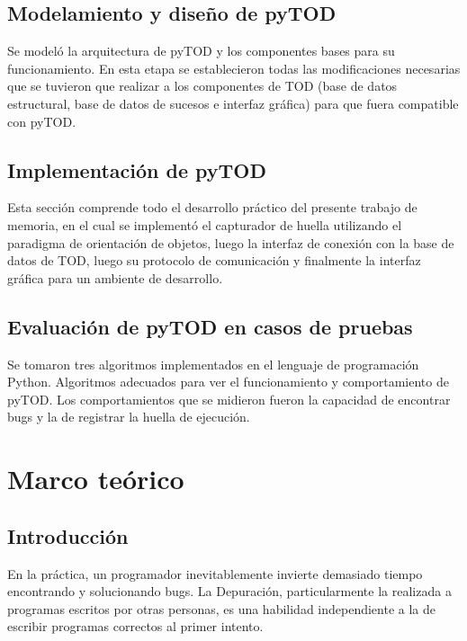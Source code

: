\documentclass[12pt,legalpaper]{report}
\begin{document}
	\section{Modelamiento y diseño de pyTOD}

    Se modeló la arquitectura de pyTOD y los componentes bases para su funcionamiento.  En esta etapa se establecieron todas las modificaciones necesarias que se tuvieron que realizar a los componentes de TOD (base de datos estructural, base de datos de sucesos e interfaz gráfica) para que fuera compatible con pyTOD.

	\section{Implementación de pyTOD}

    Esta sección comprende todo el desarrollo práctico del presente trabajo de memoria, en el cual se implementó el capturador de huella utilizando el paradigma de orientación de objetos, luego la interfaz de conexión con la base de datos de TOD, luego su protocolo de comunicación y finalmente la interfaz gráfica para un ambiente de desarrollo.
    

	\section{Evaluación de pyTOD en casos de pruebas}

 Se tomaron tres algoritmos implementados en el lenguaje de programación Python.  Algoritmos adecuados para ver el funcionamiento y comportamiento de pyTOD.  Los comportamientos que se midieron fueron la capacidad de encontrar bugs y la de registrar la huella de ejecución.


\chapter{Marco teórico}
	\section{Introducción}

En la práctica, un programador inevitablemente invierte demasiado tiempo encontrando y solucionando bugs. La Depuración, particularmente la realizada a programas escritos por otras personas, es una habilidad independiente a la de escribir programas correctos al primer intento.
\end{document}
